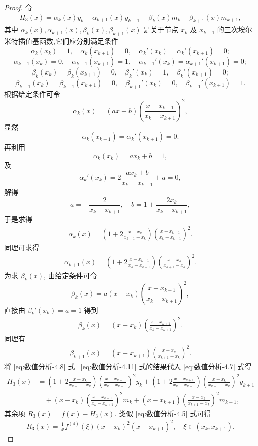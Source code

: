 \documentclass[../../main.tex]{subfiles}
\begin{document}
\begin{proof}
令
\begin{align}
H_3(x) = \alpha_k(x)y_k + \alpha_{k+1}(x)y_{k+1} + \beta_k(x)m_k + \beta_{k+1}(x)m_{k+1}, \label{eq:数值分析-4.7}
\end{align}
其中 $\alpha_k(x), \alpha_{k+1}(x), \beta_k(x), \beta_{k+1}(x)$ 是关于节点 $x_k$ 及 $x_{k+1}$ 的三次埃尔米特插值基函数,它们应分别满足条件
\[
\alpha_k(x_k) = 1, \quad \alpha_k(x_{k+1}) = 0, \quad \alpha_k'(x_k) = \alpha_k'(x_{k+1}) = 0;
\]
\[
\alpha_{k+1}(x_k) = 0, \quad \alpha_{k+1}(x_{k+1}) = 1, \quad \alpha_{k+1}'(x_k) = \alpha_{k+1}'(x_{k+1}) = 0;
\]
\[
\beta_k(x_k) = \beta_k(x_{k+1}) = 0, \quad \beta_k'(x_k) = 1, \quad \beta_k'(x_{k+1}) = 0;
\]
\[
\beta_{k+1}(x_k) = \beta_{k+1}(x_{k+1}) = 0, \quad \beta_{k+1}'(x_k) = 0, \quad \beta_{k+1}'(x_{k+1}) = 1.
\]
根据给定条件可令
\[
\alpha_k(x) = (ax + b) \left( \frac{x - x_{k+1}}{x_k - x_{k+1}} \right)^2,
\]
显然
\[
\alpha_k(x_{k+1}) = \alpha_k'(x_{k+1}) = 0.
\]
再利用
\[
\alpha_k(x_k) = ax_k + b = 1,
\]
及
\[
\alpha_k'(x_k) = 2 \frac{ax_k + b}{x_k - x_{k+1}} + a = 0,
\]
解得
\[
a = -\frac{2}{x_k - x_{k+1}}, \quad b = 1 + \frac{2x_k}{x_k - x_{k+1}},
\]
于是求得
\begin{align}
\alpha_k(x) = \left( 1 + 2 \frac{x - x_k}{x_{k+1} - x_k} \right) \left( \frac{x - x_{k+1}}{x_k - x_{k+1}} \right)^2. \label{eq:数值分析-4.8}
\end{align}
同理可求得
\begin{align}
\alpha_{k+1}(x) = \left( 1 + 2 \frac{x - x_{k+1}}{x_k - x_{k+1}} \right) \left( \frac{x - x_k}{x_{k+1} - x_k} \right)^2. \label{eq:数值分析-4.9}
\end{align}
为求 $\beta_k(x)$, 由给定条件可令
\[
\beta_k(x) = a(x - x_k) \left( \frac{x - x_{k+1}}{x_k - x_{k+1}} \right)^2,
\]
直接由 $\beta_k'(x_k) = a = 1$ 得到
\begin{align}
\beta_k(x) = (x - x_k) \left( \frac{x - x_{k+1}}{x_k - x_{k+1}} \right)^2. \label{eq:数值分析-4.10}
\end{align}
同理有
\begin{align}
\beta_{k+1}(x) = (x - x_{k+1}) \left( \frac{x - x_k}{x_{k+1} - x_k} \right)^2. \label{eq:数值分析-4.11}
\end{align}
将 \eqref{eq:数值分析-4.8} 式~ \eqref{eq:数值分析-4.11} 式的结果代入 \eqref{eq:数值分析-4.7} 式得
\begin{align*}
H_3(x) &= \left( 1 + 2 \frac{x - x_k}{x_{k+1} - x_k} \right) \left( \frac{x - x_{k+1}}{x_k - x_{k+1}} \right)^2 y_k + \left( 1 + 2 \frac{x - x_{k+1}}{x_k - x_{k+1}} \right) \left( \frac{x - x_k}{x_{k+1} - x_k} \right)^2 y_{k+1} \\
&\quad + (x - x_k) \left( \frac{x - x_{k+1}}{x_k - x_{k+1}} \right)^2 m_k + (x - x_{k+1}) \left( \frac{x - x_k}{x_{k+1} - x_k} \right)^2 m_{k+1}, 
\end{align*}
其余项 $R_3(x) = f(x) - H_3(x)$. 类似 \eqref{eq:数值分析-4.5} 式可得
\begin{align*}
R_3(x) = \frac{1}{4!} f^{(4)}(\xi) (x - x_k)^2 (x - x_{k+1})^2, \quad \xi \in (x_k, x_{k+1}). 
\end{align*}
\end{proof}
\end{document}
